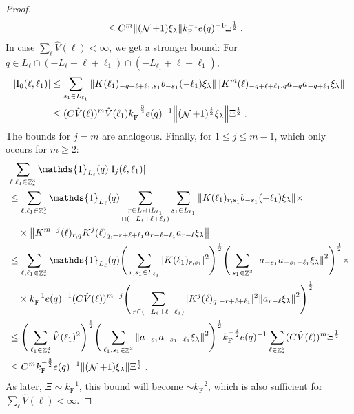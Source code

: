 \documentclass[12pt,a4paper]{article}
\numberwithin{equation}{section}
\newcommand{\1}{\mathbb{I}}
\newcommand{\F}{\mathrm{F}}
\newcommand{\I}{\mathrm{I}}
\DeclareMathOperator{\Z}{\mathbb{Z}}
\DeclareMathOperator{\NN}{\mathcal{N}}
\newcommand{\half}{\frac{1}{2}}
\theoremstyle{plain}
\theoremstyle{definition}
\theoremstyle{remark}
\theoremstyle{plain}
\theoremstyle{definition}
\theoremstyle{remark}
\begin{document}
\begin{proof}
{\begin{align}
	&\leq C^m \norm{(\NN+1) \xi_\lambda}
		k_{\F}^{-1} e(q)^{-1} \Xi^\half \;. \label{eq:estEQ2171_Coulomb}
\end{align}
In case $ \sum_\ell \hat{V}(\ell) < \infty $, we get a stronger bound: For $ q \in L_\ell \cap (-L_\ell + \ell + \ell_1) \cap (-L_{\ell_1} + \ell + \ell_1) $,}
\begin{align}
	|\I_0(\ell, \ell_1)|
	&\leq \sum\limits_{s_1 \in L_{\ell_1}}
		\norm{K(\ell_1)_{-q+\ell+\ell_1,s_1} b_{-s_1}(-\ell_1) \xi_\lambda}
		\norm{ K^m(\ell)_{-q+\ell+\ell_1,q}a_{-q}a_{-q+\ell_1} \xi_\lambda } \nonumber\\
	&\leq (C \hat{V}(\ell))^m
		\hat{V}(\ell_1)
		k_{\F}^{-\frac 32} e(q)^{-1}
		\norm{(\NN+1)^\half\xi_\lambda} \Xi^\half \;. \label{eq:estEQ2171}
\end{align}
The bounds for $ j = m $ are analogous. Finally, for $ 1 \le j \le m-1 $, which only occurs for $ m \ge 2 $:
\textcolor{green!30!black}{
\begin{align}
	&\sum_{\ell,\ell_1 \in \Z^3_*} \mathds{1}_{L_\ell}(q) |\I_j(\ell, \ell_1)| \nonumber\\
	&\leq \sum_{\ell,\ell_1 \in \Z^3_*} \mathds{1}_{L_\ell}(q) \sum\limits_{\substack{r\in L_{\ell} \cap L_{\ell_1} \\ \cap (-L_{\ell}+\ell+\ell_1)}} 
		\sum\limits_{s_1\in L_{\ell_1}} 
		\norm{K(\ell_1)_{r,s_1} b_{-s_1}(-\ell_1) \xi_\lambda} \times \nonumber\\
	&\quad \times \norm{ K^{m-j}(\ell)_{r,q} K^j(\ell)_{q,-r+\ell+\ell_1} a_{r-\ell-\ell_1} a_{r-\ell} \xi_\lambda } \nonumber\\
	&\leq \sum_{\ell,\ell_1 \in \Z^3_*} \mathds{1}_{L_\ell}(q) \Bigg( \sum\limits_{r,s_1\in L_{\ell_1}} 
		|K(\ell_1)_{r,s_1}|^2 \Bigg)^{\half}
		\Bigg( \sum\limits_{s_1 \in \Z^3}
		\norm{a_{-s_1} a_{-s_1+\ell_1} \xi_\lambda}^2 \Bigg)^{\half} \times \nonumber\\
		&\quad \times k_{\F}^{-1} e(q)^{-1} (C \hat{V}(\ell))^{m-j}
		\Bigg( \sum\limits_{r\in (-L_{\ell}+\ell+\ell_1)} 
		|K^j(\ell)_{q,-r+\ell+\ell_1}|^2
		\norm{ a_{r-\ell} \xi_\lambda }^2 \Bigg)^{\half} \nonumber\\
	&\leq  \Bigg( \sum_{\ell_1 \in \Z^3_*} 
		\hat{V}(\ell_1)^2 \Bigg)^{\half}
		\Bigg( \sum\limits_{\ell_1,s_1 \in \Z^3}
		\norm{a_{-s_1} a_{-s_1+\ell_1} \xi_\lambda}^2 \Bigg)^{\half}
		k_{\F}^{-\frac 32} e(q)^{-1} \sum_{\ell \in \Z^3_*} (C \hat{V}(\ell))^m \Xi^\half \nonumber\\
	&\leq C^m k_{\F}^{-\frac 32} e(q)^{-1}
		\norm{(\NN+1) \xi_\lambda} \Xi^{\half} \;. \label{eq:estEQ2172}
\end{align}
As later, $ \Xi \sim k_{\F}^{-1} $, this bound will become $ \sim k_{\F}^{-2} $, which is also sufficient for $ \sum_\ell \hat{V}(\ell) < \infty $.}
\end{proof}
\end{document}
